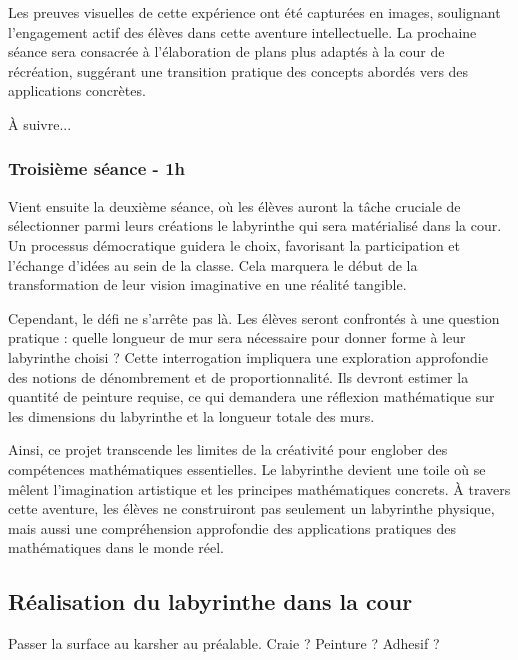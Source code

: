 Les preuves visuelles de cette expérience ont été capturées en images, soulignant l'engagement actif des élèves dans cette aventure intellectuelle.
La prochaine séance sera consacrée à l'élaboration de plans plus adaptés à la cour de récréation, suggérant une transition pratique des concepts abordés 
vers des applications concrètes. 

À suivre...

\subsubsection*{Troisième séance - 1h}
Vient ensuite la deuxième séance, où les élèves auront la tâche cruciale de sélectionner parmi leurs créations le labyrinthe qui sera
matérialisé dans la cour. Un processus démocratique guidera le choix, favorisant la participation et l'échange d'idées au sein de la classe.
Cela marquera le début de la transformation de leur vision imaginative en une réalité tangible.

Cependant, le défi ne s'arrête pas là. Les élèves seront confrontés à une question pratique : quelle longueur de mur sera nécessaire pour
donner forme à leur labyrinthe choisi ? Cette interrogation impliquera une exploration approfondie des notions de dénombrement et de proportionnalité.
Ils devront estimer la quantité de peinture requise, ce qui demandera une réflexion mathématique sur les dimensions du labyrinthe et
la longueur totale des murs.

Ainsi, ce projet transcende les limites de la créativité pour englober des compétences mathématiques essentielles. Le labyrinthe devient
une toile où se mêlent l'imagination artistique et les principes mathématiques concrets. À travers cette aventure, les élèves ne
construiront pas seulement un labyrinthe physique, mais aussi une compréhension approfondie des applications pratiques des mathématiques
dans le monde réel.

\subsection{Réalisation du labyrinthe dans la cour}
Passer la surface au karsher au préalable.
Craie ? Peinture ? Adhesif ? 
